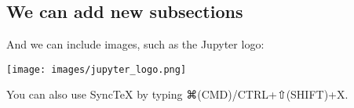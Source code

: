 \documentclass{article}
\begin{document}
\subsection{We can add new subsections}

And we can include images, such as the Jupyter logo:

\begin{center}

  \texttt{[image: images/jupyter\_logo.png]}

\end{center}










\pagebreak













You can also use SyncTeX by typing ⌘(CMD)/CTRL+⇧(SHIFT)+X.
\end{document}
